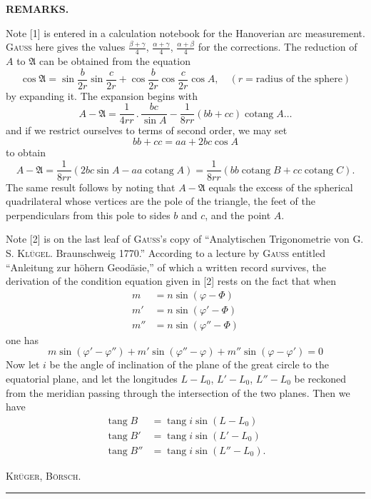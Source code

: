 \vspace*{.11\textheight}
{\small
\begin{center}\textbf{REMARKS.}\end{center}

Note [1] is entered in a calculation notebook for the Hanoverian arc measurement. \textsc{Gauss}
here gives the values \(\frac{\beta+\gamma}{4}\), \(\frac{\alpha+\gamma}{4}\), \(\frac{\alpha+\beta}{4}\) for the corrections. The reduction of \(A\) to \(\mathfrak A\) can be obtained
from the equation
\[
\cos\mathfrak A=\sin\frac b{2r}\sin\frac c{2r}
+\cos\frac b{2r}\cos\frac c{2r}\cos A,\quad (r=\text{radius of the sphere})
\]
\noindent by expanding it. The expansion begins with
\[
A-\mathfrak A=\frac1{4rr}\,.\,\frac{bc}{\sin A}
-\frac1{8rr}(bb+cc)\operatorname{cotang}A\ldots
\]
\noindent and if we restrict ourselves to terms of second order, we may set
\[
bb+cc=aa+2bc\cos A
\]
\noindent to obtain
\[
A-\mathfrak A=\frac1{8rr}(2bc\sin A-aa\operatorname{cotang}A)
=\frac1{8rr}(bb\operatorname{cotang}B+cc\operatorname{cotang}C).
\]
\noindent The same result follows by noting that \(A-\mathfrak A\) equals the excess of the spherical
quadrilateral whose vertices are the pole of the triangle, the feet of the perpendiculars from this pole to sides
\(b\) and \(c\), and the point \(A\).

Note [2] is on the last leaf of \textsc{Gauss}'s copy of
“Analytischen Trigonometrie von G. S. \textsc{Klügel}. Braunschweig 1770.” According to a lecture by \textsc{Gauss}
entitled “Anleitung zur höhern Geodäsie,” of which a written record survives, the derivation of the condition
equation given in [2] rests on the fact that when
\[
\begin{aligned}
m&=n\sin(\varphi-\Phi)\\
m'&=n\sin(\varphi'-\Phi)\\
m''&=n\sin(\varphi''-\Phi)
\end{aligned}
\]
\noindent one has
\[
m\sin(\varphi'-\varphi'')+m'\sin(\varphi''-\varphi)+m''\sin(\varphi-\varphi')=0
\]
\noindent Now let \(i\) be the angle of inclination of the plane of the great circle to the equatorial plane, and
let the longitudes \(L-L_0\), \(L'-L_0\), \(L''-L_0\) be reckoned from the meridian passing through the intersection of the two planes.
Then we have
\[
\begin{aligned}
\operatorname{tang}B&=\operatorname{tang}i\sin(L-L_0)\\
\operatorname{tang}B'&=\operatorname{tang}i\sin(L'-L_0)\\
\operatorname{tang}B''&=\operatorname{tang}i\sin(L''-L_0).
\end{aligned}
\]
\par\hfill\textsc{Krüger, Börsch.}\hspace{.06\textwidth}\par
}
\begin{center}\rule{.24\textwidth}{.4pt}\end{center}

